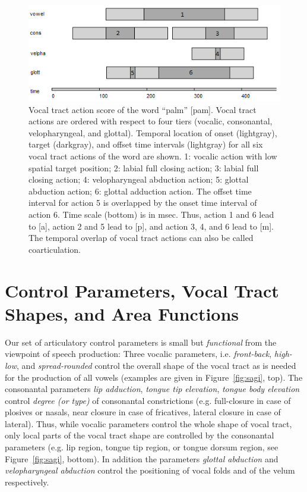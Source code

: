 \documentclass[conference]{IEEEtran}
\begin{document}
\begin{figure}[!t]
\centering
\includegraphics[width=\columnwidth]{actions}
\caption{Vocal tract action score of the word ``palm'' [pam]. Vocal
  tract actions are ordered with respect to four tiers (vocalic,
  consonantal, velopharyngeal, and glottal). Temporal location of
  onset (lightgray), target (darkgray), and offset time intervals
  (lightgray) for all six vocal tract actions of the word are shown.
  1: vocalic action with low spatial target position; 2: labial full
  closing action; 3: labial full closing action; 4: velopharyngeal
  abduction action; 5: glottal abduction action; 6: glottal adduction
  action. The offset time interval for action 5 is overlapped by the
  onset time interval of action 6. Time scale (bottom) is in msec.
  Thus, action 1 and 6 lead to [a], action 2 and 5 lead to [p], and
  action 3, 4, and 6 lead to [m]. The temporal overlap of vocal tract
  actions can also be called coarticulation.}
\label{fig:actions}
\end{figure}

\section{Control Parameters, Vocal Tract Shapes, and Area Functions}

Our set of articulatory control parameters is small but
\textit{functional} from the viewpoint of speech production: Three
vocalic parameters, i.e. \textit{front-back}, \textit{high-low}, and
\textit{spread-rounded} control the overall shape of the vocal tract
as is needed for the production of all vowels (examples are given in
Figure~\ref{fig:sagi}, top). The consonantal parameters \textit{lip
  adduction}, \textit{tongue tip elevation}, \textit{tongue body
  elevation} control \textit{degree (or type)} of consonantal
constrictions (e.g. full-closure in case of plosives or nasals, near
closure in case of fricatives, lateral closure in case of lateral).
Thus, while vocalic parameters control the whole shape of vocal tract,
only local parts of the vocal tract shape are controlled by the
consonantal parameters (e.g. lip region, tongue tip region, or tongue
dorsum region, see Figure~\ref{fig:sagi}, bottom). In addition the
parameters \textit{glottal abduction} and \textit{velopharyngeal
  abduction} control the positioning of vocal folds and of the velum
respectively.
\end{document}
